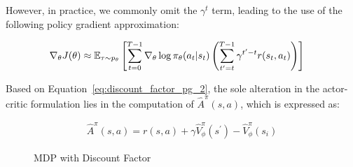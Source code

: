 \documentclass{article}
\begin{document}
However, in practice, we commonly omit the $\gamma^t$ term, leading to the use of the following policy gradient approximation:

\begin{align}
\nabla_\theta J(\theta) &\approx {\mathbb E}_{\tau\sim p_\theta}\left[\sum_{t=0}^{T-1} \nabla_\theta \log \pi_\theta(a_t \vert s_t) \left(\sum_{t^\prime = t}^{T-1} \gamma ^{t^\prime -t}r(s_t, a_t)\right) \right]\label{eq:discount_factor_pg_2}
\end{align}

Based on Equation~\eqref{eq:discount_factor_pg_2}, the sole alteration in the actor-critic formulation lies in the computation of $\hat{A}^\pi(s,a)$, which is expressed as:

\begin{align*}
    \hat{A}^\pi(s,a) = r(s,a) + \gamma \hat{V}_\phi^\pi(s^\prime) - \hat{V}_\phi^\pi(s_i)
\end{align*}

\begin{figure}[ht]
\caption{MDP with Discount Factor}\label{fig:discount_factor}
\end{figure}
\end{document}
